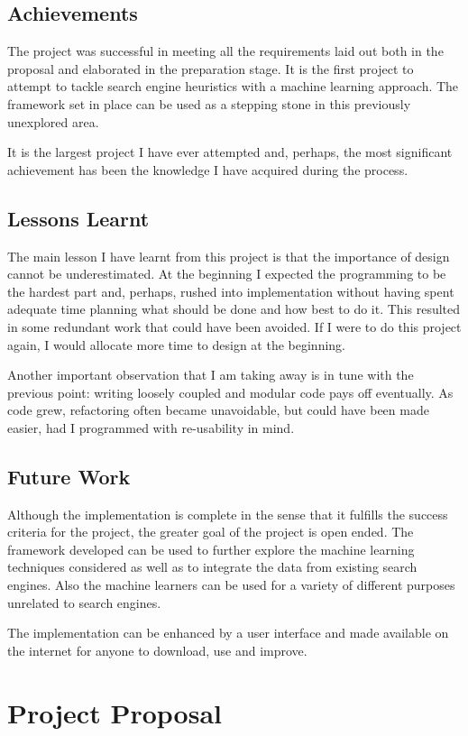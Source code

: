 \documentclass[12pt,a4paper,notitlepage,twoside]{scrbook}
\begin{document}
\section{Achievements}
The project was successful in meeting all the requirements laid out both in the proposal
and elaborated in the preparation stage. It is the first project to attempt to tackle search
engine heuristics with a machine learning approach. The framework set in place 
can be used as a stepping stone in this previously unexplored area.

It is the largest project I have ever attempted and, perhaps, the most significant
achievement has been the knowledge I have acquired during the process.

\section{Lessons Learnt}
The main lesson I have learnt from this project is that the importance of design cannot be
underestimated. At the beginning I expected the programming to be the hardest part and,
perhaps, rushed into implementation without having spent adequate time planning what
should be done and how best to do it. This resulted in some redundant work that
could have been avoided. If I were to do this project again, I would allocate more time to
design at the beginning.

Another important observation that I am taking away is in tune with the previous point:
writing loosely coupled and modular code pays off eventually. As code grew, refactoring
often became unavoidable, but could have been made easier, had I programmed with
re-usability in mind.

\section{Future Work}
Although the implementation is complete in the sense that it fulfills the success criteria
for the project, the greater goal of the project is open ended. The framework developed can be
used to further explore the machine learning techniques considered as well as to integrate
the data from existing search engines. Also the machine learners can be used for a
variety of different purposes unrelated to search engines.

The implementation can be enhanced by a user interface and made available on the internet
for anyone to download, use and improve.





\appendix

\chapter{Project Proposal}
\label{prop}


\end{document}
